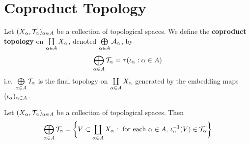 \documentclass{book}
\begin{document}
	
	
	
	
	
	
	
	
	
	
	\newpage
	\section{Coproduct Topology}

	\begin{defn} 
			Let $(X_{\alpha}, \mathcal{T}_{\alpha})_{\alpha \in A}$ be a collection of topological spaces. We define the \textbf{coproduct topology} on $\coprod\limits_{\alpha \in A}X_{\alpha}$, denoted $\bigoplus\limits_{\alpha \in A} \mathcal{A}_{\alpha}$, by 
		$$\bigoplus\limits_{\alpha \in A} \mathcal{T}_{\alpha} = \tau(\iota_{\alpha}: \alpha \in A)$$
		i.e. $\bigoplus\limits_{\alpha \in A} \mathcal{T}_{\alpha}$ is the final topology on $\coprod\limits_{\alpha \in A} X_{\alpha}$ generated by the embedding maps $(\iota_{\alpha})_{\alpha \in A}$.
	\end{defn}

	\begin{ex} 
		Let $(X_{\alpha}, \mathcal{T}_{\alpha})_{\alpha \in A}$ be a collection of topological spaces. Then $$\bigoplus\limits_{\alpha \in A} \mathcal{T}_{\alpha} = \bigg\{V \subset \coprod_{\alpha \in A}  X_{\alpha}: \text{ for each $\alpha \in A$, $\iota_{\alpha}^{-1}(V) \in \mathcal{T}_{\alpha}$} \bigg\}$$
	\end{ex}
	
\end{document}
